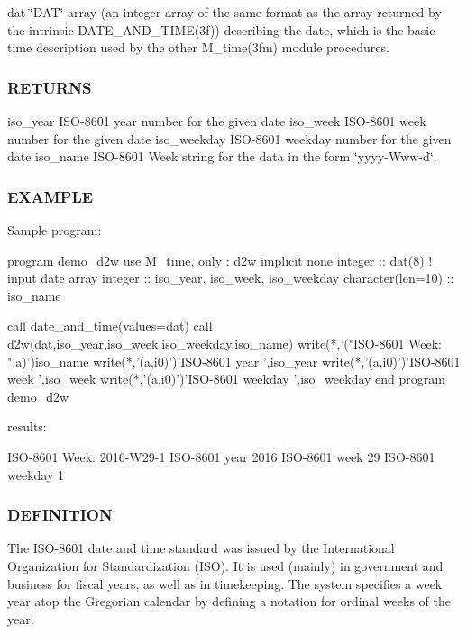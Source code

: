 dat \char`\"{}\+D\+A\+T\char`\"{} array (an integer array of the same format as the array returned by the intrinsic D\+A\+T\+E\+\_\+\+A\+N\+D\+\_\+\+T\+I\+M\+E(3f)) describing the date, which is the basic time description used by the other M\+\_\+time(3fm) module procedures. \subsubsection*{R\+E\+T\+U\+R\+NS}

iso\+\_\+year I\+S\+O-\/8601 year number for the given date iso\+\_\+week I\+S\+O-\/8601 week number for the given date iso\+\_\+weekday I\+S\+O-\/8601 weekday number for the given date iso\+\_\+name I\+S\+O-\/8601 Week string for the data in the form \char`\"{}yyyy-\/\+Www-\/d\char`\"{}.

\subsubsection*{E\+X\+A\+M\+P\+LE}

\begin{DoxyVerb}Sample program:

 program demo_d2w
 use M_time, only : d2w
 implicit none
 integer           :: dat(8)     ! input date array
 integer           :: iso_year, iso_week, iso_weekday
 character(len=10) :: iso_name

    call date_and_time(values=dat)
    call d2w(dat,iso_year,iso_week,iso_weekday,iso_name)
    write(*,'("ISO-8601 Week:   ",a)')iso_name
    write(*,'(a,i0)')'ISO-8601 year    ',iso_year
    write(*,'(a,i0)')'ISO-8601 week    ',iso_week
    write(*,'(a,i0)')'ISO-8601 weekday ',iso_weekday
 end program demo_d2w

results:

 ISO-8601 Week:   2016-W29-1
 ISO-8601 year    2016
 ISO-8601 week    29
 ISO-8601 weekday 1
\end{DoxyVerb}


\subsubsection*{D\+E\+F\+I\+N\+I\+T\+I\+ON}

The I\+S\+O-\/8601 date and time standard was issued by the International Organization for Standardization (I\+SO). It is used (mainly) in government and business for fiscal years, as well as in timekeeping. The system specifies a week year atop the Gregorian calendar by defining a notation for ordinal weeks of the year.

